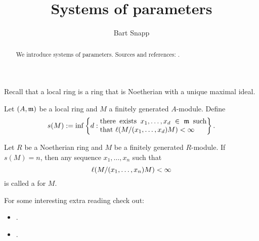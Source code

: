 \documentclass{ximera}
\author{Bart Snapp}
\title{Systems of parameters}
\begin{document}
\begin{abstract}
  We introduce systems of parameters. Sources and references:
  \cite{sD2008}.
\end{abstract}
\maketitle


Recall that a local ring is a ring that is Noetherian with a unique maximal ideal.

\begin{definition}
  Let $(A,\mathfrak{m})$ be a local ring and $M$ a finitely generated
  $A$-module. Define
  \[
  s(M) := \inf\left\{d:
  \begin{minipage}{35ex}
    there exists $x_1,\dots, x_d\in \m$ such that $\l(M/(x_1,\dots,x_d)M)<\infty$
  \end{minipage} \right\}.
  \]
\end{definition}

\begin{definition}
  Let $R$ be a Noetherian ring and $M$ be a finitely generated
  $R$-module. If $s(M) = n$, then any sequence $x_1,\dots, x_n$ such
  that
  \[
  \l(M/(x_1,\dots,x_n)M)<\infty\index{finite length}
  \]
  is called a  for $M$. 
\end{definition}





For some interesting extra reading check out:
\begin{itemize}

\item {}.
\item {}.
\end{itemize}
\end{document}
